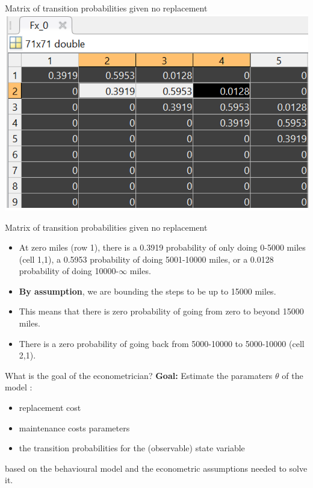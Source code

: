 \documentclass[aspectratio=169]{beamer}
\begin{document}
	\begin{frame}{Matrix of transition probabilities given no replacement}
		\includegraphics[width=\textwidth]{figs/2_transmat_fx0.PNG}
	\end{frame}
	
	
	\begin{frame}{Matrix of transition probabilities given no replacement}
		
		\begin{itemize}
			\itemsep1em
			\item At zero miles (row 1), there is a 0.3919 probability of only doing 0-5000 miles (cell 1,1), a 0.5953 probability of doing 5001-10000 miles, or a 0.0128 probability of doing 10000-$\infty$ miles.
			\item \textbf{By assumption}, we are bounding the steps to be up to 15000 miles.
			\item This means that there is zero probability of going from zero to beyond 15000 miles.	
			\item There is a zero probability of going back from 5000-10000 to 5000-10000 (cell 2,1).
		\end{itemize}
	\end{frame}
	
	\begin{frame}{What is the goal of the econometrician?}
		\textbf{Goal:} Estimate the paramaters $\theta$ of the model :
		\begin{itemize}
			\itemsep1em
			\item replacement cost
			\item maintenance costs parameters
			\item the transition probabilities for the (observable) state variable
		\end{itemize}
		based on the behavioural model and the econometric assumptions needed to solve it.
	\end{frame}
	
\end{document}

